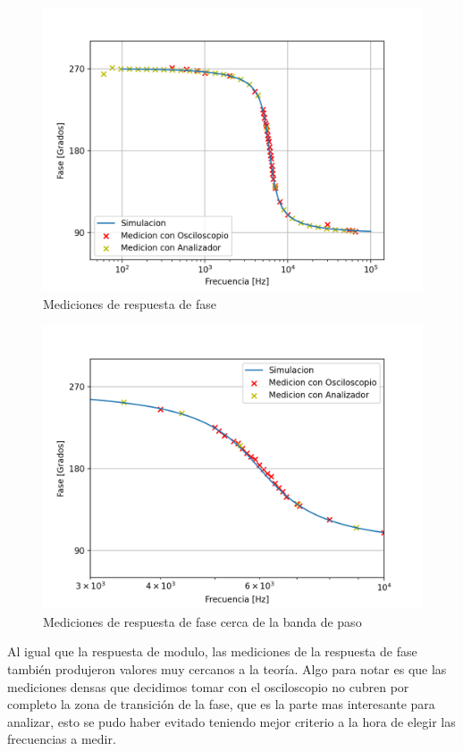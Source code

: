 \documentclass[11pt,a4paper]{report}
\begin{document}
\begin{figure}[H]
\centering
\includegraphics[scale=0.7]{figs/plots/fase.png}
\caption{Mediciones de respuesta de fase}
\end{figure}

\begin{figure}[H]
\centering
\includegraphics[scale=0.7]{figs/plots/fase_zoom.png}
\caption{Mediciones de respuesta de fase cerca de la banda de paso}
\end{figure}

Al igual que la respuesta de modulo, las mediciones de la respuesta de fase también produjeron valores muy cercanos a la teoría. Algo para notar es que las mediciones densas que decidimos tomar con el osciloscopio no cubren por completo la zona de transición de la fase, que es la parte mas interesante para analizar, esto se pudo haber evitado teniendo mejor criterio a la hora de elegir las frecuencias a medir.
\end{document}
